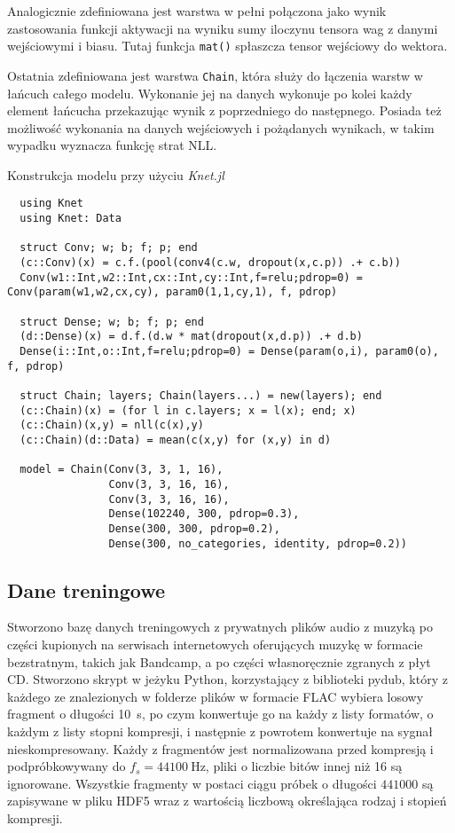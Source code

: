 \documentclass[pl,12pt]{aghdpl}
\let\Oldsubsection\subsection%
\renewcommand{\subsection}{\FloatBarrier\Oldsubsection}
\begin{document}
Analogicznie zdefiniowana jest warstwa w pełni połączona jako wynik
zastosowania funkcji aktywacji na wyniku sumy iloczynu tensora wag z danymi
wejściowymi i biasu. Tutaj funkcja \lstinline|mat()| spłaszcza tensor wejściowy
do wektora.

Ostatnia zdefiniowana jest warstwa \lstinline|Chain|, która służy do łączenia
warstw w łańcuch całego modelu. Wykonanie jej na danych wykonuje po kolei każdy
element łańcucha przekazując wynik z poprzedniego do następnego. Posiada też
możliwość wykonania na danych wejściowych i pożądanych wynikach, w takim
wypadku wyznacza funkcję strat NLL.

\begin{program}
  \caption{Konstrukcja modelu przy użyciu \textit{Knet.jl}}
  \label{lst:Knet_model}
  \begin{lstlisting}
  using Knet
  using Knet: Data

  struct Conv; w; b; f; p; end
  (c::Conv)(x) = c.f.(pool(conv4(c.w, dropout(x,c.p)) .+ c.b))
  Conv(w1::Int,w2::Int,cx::Int,cy::Int,f=relu;pdrop=0) = Conv(param(w1,w2,cx,cy), param0(1,1,cy,1), f, pdrop)

  struct Dense; w; b; f; p; end
  (d::Dense)(x) = d.f.(d.w * mat(dropout(x,d.p)) .+ d.b)
  Dense(i::Int,o::Int,f=relu;pdrop=0) = Dense(param(o,i), param0(o), f, pdrop)

  struct Chain; layers; Chain(layers...) = new(layers); end
  (c::Chain)(x) = (for l in c.layers; x = l(x); end; x)
  (c::Chain)(x,y) = nll(c(x),y)
  (c::Chain)(d::Data) = mean(c(x,y) for (x,y) in d)

  model = Chain(Conv(3, 3, 1, 16),
                Conv(3, 3, 16, 16),
                Conv(3, 3, 16, 16),
                Dense(102240, 300, pdrop=0.3),
                Dense(300, 300, pdrop=0.2),
                Dense(300, no_categories, identity, pdrop=0.2))
  \end{lstlisting}
\end{program}
\subsection{Dane treningowe}
Stworzono bazę danych treningowych z prywatnych plików audio z muzyką po
części kupionych na serwisach internetowych oferujących muzykę w formacie
bezstratnym, takich jak Bandcamp, a po części własnoręcznie zgranych z płyt
CD. Stworzono skrypt w jeżyku Python, korzystający z biblioteki pydub, który
z każdego ze znalezionych w folderze plików w formacie FLAC wybiera losowy
fragment o długości \SI{10}{\second}, po czym konwertuje go na każdy z listy
formatów, o każdym z listy stopni kompresji, i następnie z powrotem konwertuje
na sygnał nieskompresowany. Każdy z fragmentów jest normalizowana przed
kompresją i podpróbkowywany do $f_s = \SI{44100}{\hertz}$, pliki o liczbie bitów
innej niż 16 są ignorowane. Wszystkie fragmenty w postaci ciągu próbek o
długości $441000$ są zapisywane w pliku HDF5 wraz z wartością liczbową
określająca rodzaj i stopień kompresji.
\end{document}
